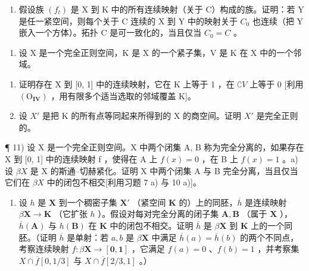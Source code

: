 \begin{enumerate}
\def\labelenumi{\alph{enumi})}
\setcounter{enumi}{1}
\tightlist
\item
  假设族 \((f_{t})\) 是 X 到 K 中的所有连续映射（关于 C）构成的族。证明：若 Y 是任一紧空间，则每个关于 C 连续的 X 到 Y 中的映射关于 \(C_{0}\) 也连续（把 Y 嵌入一个方体）。拓扑 C 是可一致化的，当且仅当 \(C_{0} = C\) 。
\end{enumerate}

\begin{enumerate}
\def\labelenumi{\arabic{enumi})}
\setcounter{enumi}{9}
\tightlist
\item
  设 X 是一个完全正则空间，K 是 X 的一个紧子集，V 是 K 在 X 中的一个邻域。
\end{enumerate}

\begin{enumerate}
\def\labelenumi{\alph{enumi})}
\item
  证明存在 X 到 {[}0, 1{]} 中的连续映射，它在 K 上等于 1 ，在 \(\complement V\) 上等于 0 {[}利用 \((\mathrm{O}_{\mathbf{IV}})\) ，用有限多个适当选取的邻域覆盖 K{]}。
\item
  设 \(X'\) 是把 K 的所有点等同起来所得到的 X 的商空间。证明 \(X'\) 是完全正则的。
\end{enumerate}

¶ 11) 设 X 是一个完全正则空间。X 中两个闭集 A, B 称为完全分离的，如果存在 X 到 {[}0, 1{]} 中的连续映射 f ，使得在 A 上 \(f(x) = 0\) ，在 B 上 \(f(x) = 1\) 。a) 设 \(\beta X\) 是 X 的斯通–切赫紧化。证明 X 中两个闭集 A 与 B 完全分离，当且仅当它们在 \(\beta X\) 中的闭包不相交{[}利用习题 7 a) 与 10 a){]}。

\begin{enumerate}
\def\labelenumi{\alph{enumi})}
\setcounter{enumi}{1}
\tightlist
\item
  设 \(h\) 是 \(\mathbf{X}\) 到一个稠密子集 \(\mathbf{X}'\) （紧空间 \(\mathbf{K}\) 的）上的同胚，\(\overline{h}\) 是连续映射 \(\beta \mathbf{X} \to \mathbf{K}\) （它扩张 \(h\) ）。假设对每对完全分离的闭子集 \(\mathbf{A}, \mathbf{B}\) （属于 \(\mathbf{X}\) ），\(\overline{h}(\mathbf{A})\) 与 \(h(\mathbf{B})\) 在 \(\mathbf{K}\) 中的闭包不相交。证明 \(\overline{h}\) 是 \(\beta \mathbf{X}\) 到 \(\mathbf{K}\) 上的一个同胚。（证明 \(\overline{h}\) 是单射：若 \(a, b\) 是 \(\beta \mathbf{X}\) 中满足 \(\overline{h}(a) = \overline{h}(b)\) 的两个不同点，考察连续映射 \(f: \beta \mathbf{X} \to [\mathbf{0}, \mathbf{1}]\) ，它满足 \(f(a) = 0\) 、\(f(b) = 1\) ，并考察集 \(X \cap \overline{f}[0, 1/3]\) 与 \(X \cap \overline{f}[2/3, 1]\) 。）
\end{enumerate}

